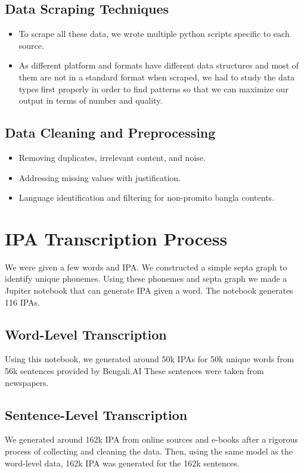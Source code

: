 \subsection{Data Scraping Techniques}
\begin{itemize}
    \item To scrape all these data, we wrote multiple python scripts specific to each source.
    \item As different platform and formats have different data structures and most of them are not in a standard format when scraped, we had to study the data types first properly in order to find patterns so that we can maximize our output in terms of number and quality.
\end{itemize}

\subsection{Data Cleaning and Preprocessing}
\begin{itemize}
    \item Removing duplicates, irrelevant content, and noise.
    \item Addressing missing values with justification.
    \item Language identification and filtering for non-promito bangla contents.
\end{itemize}

\section{IPA Transcription Process}
We were given a few words and IPA. We constructed a simple septa graph to identify unique phonemes. Using these phonemes and septa graph we made a Jupiter notebook that can generate IPA given a word. The notebook generates 116 IPAs.



\subsection{Word-Level Transcription}
Using this notebook, we generated around 50k IPAs for 50k unique words from 56k sentences provided by Bengali.AI These sentences were taken from newspapers.

\subsection{Sentence-Level Transcription}
We generated around 162k IPA from online sources and e-books after a rigorous process of collecting and cleaning the data. Then, using the same model as the word-level data, 162k IPA was generated for the 162k sentences.


